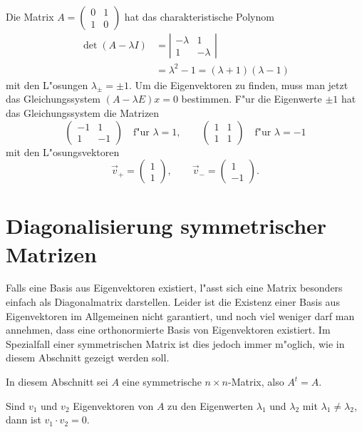 \begin{beispiel}
Die Matrix $A=\begin{pmatrix}0&1\\1&0\end{pmatrix}$ hat das 
charakteristische Polynom
\begin{align*}
\det(A-\lambda I)&=\left|\begin{matrix}-\lambda&1\\1&-\lambda\end{matrix}\right|\\
&=\lambda^2-1=(\lambda+1)(\lambda-1)
\end{align*}
mit den L"osungen $\lambda_\pm=\pm1$. Um die Eigenvektoren zu finden, muss
man jetzt das Gleichungssystem $(A-\lambda E)x=0$ bestimmen. F"ur die Eigenwerte
$\pm1$ hat das Gleichungssystem die Matrizen
\[
\begin{pmatrix}
-1&1\\1&-1
\end{pmatrix}\quad \text{f"ur $\lambda=1$},\qquad
\begin{pmatrix}
1&1\\1&1
\end{pmatrix}\quad\text{f"ur $\lambda=-1$}
\]
mit den L"osungsvektoren 
\[
\vec v_+=\begin{pmatrix}1\\1\end{pmatrix},
\qquad
\vec v_-=\begin{pmatrix}1\\-1\end{pmatrix}.
\]
\end{beispiel}

\section{Diagonalisierung symmetrischer Matrizen\label{section-diag-sym}}
Falls eine Basis aus Eigenvektoren existiert, l"asst sich eine Matrix
besonders einfach als Diagonalmatrix darstellen. Leider ist die Existenz
einer Basis aus Eigenvektoren im Allgemeinen nicht garantiert, und noch
viel weniger darf man annehmen, dass eine orthonormierte Basis
von Eigenvektoren existiert. Im Spezialfall einer symmetrischen Matrix
ist dies jedoch immer m"oglich, wie in diesem Abschnitt gezeigt werden
soll.

In diesem Abschnitt sei $A$ eine symmetrische $n\times n$-Matrix,
also  $A^t=A$.

\begin{hilfssatz}
Sind $v_1$ und $v_2$ Eigenvektoren von $A$ zu den Eigenwerten 
$\lambda_1$ und $\lambda_2$ mit $\lambda_1\ne \lambda_2$, dann
ist $v_1\cdot v_2=0$.
\end{hilfssatz}

